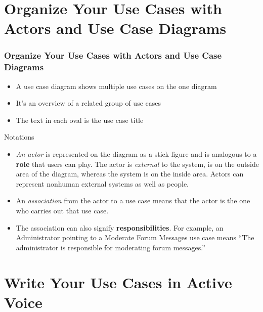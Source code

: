 \documentclass{beamer}
\begin{document}
\section{Organize Your Use Cases with Actors and Use Case Diagrams}
 
\begin{frame}
  \frametitle{Organize Your Use Cases with Actors and Use Case Diagrams}
      \begin{itemize}
        \item A use case diagram shows multiple use cases on the one diagram
        \item It’s an overview of a related group of use cases
        \item The text in each oval is the use case title 
      \end{itemize}
 \end{frame}
\begin{frame}
 	\begin{block}{Notations}
		\begin{itemize} 
		  \item \emph{An actor} is represented on the diagram as a stick figure and
		  is analogous to a \textbf{role} that users can play.
		  The actor is \emph{external} to the system, is on the outside area of the
		  diagram, whereas the system is on the inside area. Actors can represent
		  nonhuman external systems as well as people.
		  \item An \emph{association} from the actor to a use case means that the
		  actor is the one who carries out that use case.
		  \item The association can also signify \textbf{responsibilities}. 
		  	For example, an Administrator pointing to a Moderate Forum Messages
			 use case means “The administrator is responsible for moderating forum
			 messages.”
		\end{itemize}    
     \end{block}
\end{frame}

\section{Write Your Use Cases in Active Voice}
 
\end{document}
